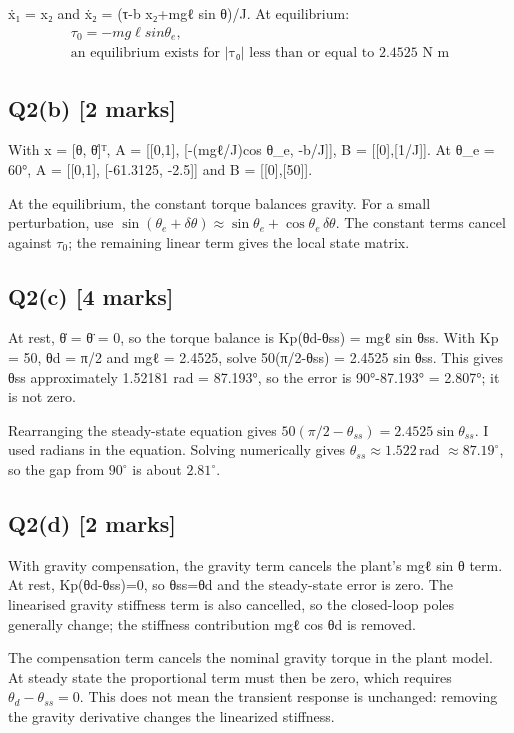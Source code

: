 \documentclass[11pt,a4paper]{article}
\begin{document}
ẋ₁ = x₂ and ẋ₂ = (τ-b x₂+mgℓ sin θ)/J.
At equilibrium:\[\begin{aligned}τ_0 = -mg\ell sin \theta_e,\\ \text{an equilibrium exists for |τ₀| less than or equal to 2.4525 N m}\end{aligned}\]

\subsection*{Q2(b) \hfill [2 marks]}

With x = [θ, θ̇]ᵀ, A = [[0,1], [-(mgℓ/J)cos θ\_e, -b/J]], B = [[0],[1/J]].
At θ\_e = 60°, A = [[0,1], [-61.3125, -2.5]] and B = [[0],[50]].\par\smallskip At the equilibrium, the constant torque balances gravity. For a small perturbation, use $\sin(\theta_e+\delta\theta)\approx\sin\theta_e+\cos\theta_e\,\delta\theta$. The constant terms cancel against $\tau_0$; the remaining linear term gives the local state matrix.

\subsection*{Q2(c) \hfill [4 marks]}

At rest, θ̇ = θ̈ = 0, so the torque balance is Kp(θd-θss) = mgℓ sin θss.
With Kp = 50, θd = π/2 and mgℓ = 2.4525, solve 50(π/2-θss) = 2.4525 sin θss.
This gives θss approximately 1.52181 rad = 87.193°, so the error is 90°-87.193° = 2.807°; it is not zero.\par\smallskip Rearranging the steady-state equation gives $50(\pi/2-\theta_{ss})=2.4525\sin\theta_{ss}$. I used radians in the equation. Solving numerically gives $\theta_{ss}\approx1.522\,$rad $\approx87.19^\circ$, so the gap from $90^\circ$ is about $2.81^\circ$.

\subsection*{Q2(d) \hfill [2 marks]}

With gravity compensation, the gravity term cancels the plant's mgℓ sin θ term.
At rest, Kp(θd-θss)=0, so θss=θd and the steady-state error is zero.
The linearised gravity stiffness term is also cancelled, so the closed-loop poles generally change; the stiffness contribution mgℓ cos θd is removed.\par\smallskip The compensation term cancels the nominal gravity torque in the plant model. At steady state the proportional term must then be zero, which requires $\theta_d-\theta_{ss}=0$. This does not mean the transient response is unchanged: removing the gravity derivative changes the linearized stiffness.
\end{document}
